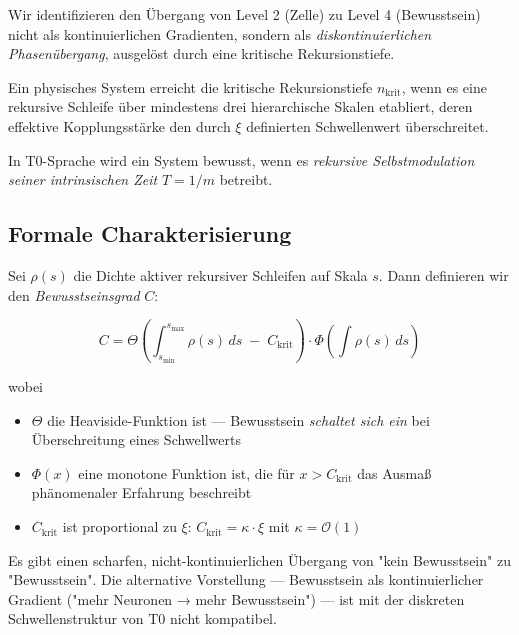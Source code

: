 \documentclass[11pt,a4paper]{article}
\begin{document}
	Wir identifizieren den Übergang von Level 2 (Zelle) zu Level 4 (Bewusstsein) nicht als kontinuierlichen Gradienten, sondern als \emph{diskontinuierlichen Phasenübergang}, ausgelöst durch eine kritische Rekursionstiefe.
	
	\begin{keybox}
		Ein physisches System erreicht die kritische Rekursionstiefe \(n_{\text{krit}}\), wenn es eine rekursive Schleife über mindestens drei hierarchische Skalen etabliert, deren effektive Kopplungsstärke den durch \(\xi\) definierten Schwellenwert überschreitet.
	\end{keybox}
	
	In T0-Sprache wird ein System bewusst, wenn es \emph{rekursive Selbstmodulation seiner intrinsischen Zeit} \(T = 1/m\) betreibt.
	
	\subsection{Formale Charakterisierung}
	
	Sei \(\rho(s)\) die Dichte aktiver rekursiver Schleifen auf Skala \(s\). Dann definieren wir den \emph{Bewusstseinsgrad} \(C\):
	
	\[
	C = \Theta\left( \int_{s_{\text{min}}}^{s_{\text{max}}} \rho(s) \, ds \;-\; C_{\text{krit}} \right) \cdot \Phi\left( \int \rho(s)\,ds \right)
	\]
	
	wobei
	\begin{itemize}
		\item \(\Theta\) die Heaviside-Funktion ist — Bewusstsein \emph{schaltet sich ein} bei Überschreitung eines Schwellwerts
		\item \(\Phi(x)\) eine monotone Funktion ist, die für \(x > C_{\text{krit}}\) das Ausmaß phänomenaler Erfahrung beschreibt
		\item \(C_{\text{krit}}\) ist proportional zu \(\xi\): \(C_{\text{krit}} = \kappa \cdot \xi\) mit \(\kappa = \mathcal{O}(1)\)
	\end{itemize}
	
	\begin{important}
		Es gibt einen scharfen, nicht-kontinuierlichen Übergang von "kein Bewusstsein" zu "Bewusstsein". Die alternative Vorstellung — Bewusstsein als kontinuierlicher Gradient ("mehr Neuronen → mehr Bewusstsein") — ist mit der diskreten Schwellenstruktur von T0 nicht kompatibel.
	\end{important}
	
\end{document}
